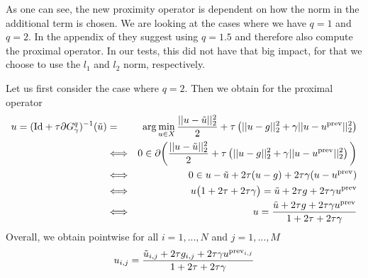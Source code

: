         As one can see, the new proximity operator is dependent on how the norm in the additional term is chosen. We are looking at the cases where we have $q = 1$ and $q = 2$. In the appendix of \cite{Strekalovskiy-Cremers-eccv14} they suggest using $q = 1.5$ and therefore also compute the proximal operator. In our tests, this did not have that big impact, for that we choose to use the $l_{1}$ and $l_{2}$ norm, respectively.

        Let us first consider the case where $q = 2$. Then we obtain for the proximal operator
            \begin{eqnarray}
                u = (\textnormal{Id} + \tau \partial G^{q}_{\gamma})^{-1}(\tilde{u}) &=& \arg \min_{u \in X} \frac{||u - \tilde{u}||_{2}^{2}}{2} + \tau \left( ||u - g||_{2}^{2} + \gamma ||u - u^{\textnormal{prev}}||_{2}^{2} \right) \notag \\
                &\Longleftrightarrow& 0 \in \partial \bigg( \frac{||u - \tilde{u}||_{2}^{2}}{2} + \tau \left( ||u - g||_{2}^{2} + \gamma ||u - u^{\textnormal{prev}}||_{2}^{2} \right) \bigg)\notag \\
                &\Longleftrightarrow& 0 \in u - \tilde{u} + 2\tau(u - g) + 2\tau\gamma (u - u^{\textnormal{prev}}) \notag \\
                &\Longleftrightarrow& u \big( 1 + 2\tau + 2\tau\gamma \big) = \tilde{u} + 2\tau g + 2\tau\gamma u^{\textnormal{prev}} \notag \\
                &\Longleftrightarrow& u = \frac{\tilde{u} + 2\tau g + 2\tau\gamma u^{\textnormal{prev}}}{1 + 2\tau + 2\tau\gamma} \notag
            \end{eqnarray}
        Overall, we obtain pointwise for all $i = 1, ..., N$ and $j = 1, ..., M$
            \begin{equation}
                u_{i, j} = \frac{\tilde{u}_{i, j} + 2\tau g_{i, j} + 2\tau\gamma u^{\textnormal{prev}_{i, j}}}{1 + 2\tau + 2\tau\gamma}
                \label{eq:prox_d_q_two}
            \end{equation}

